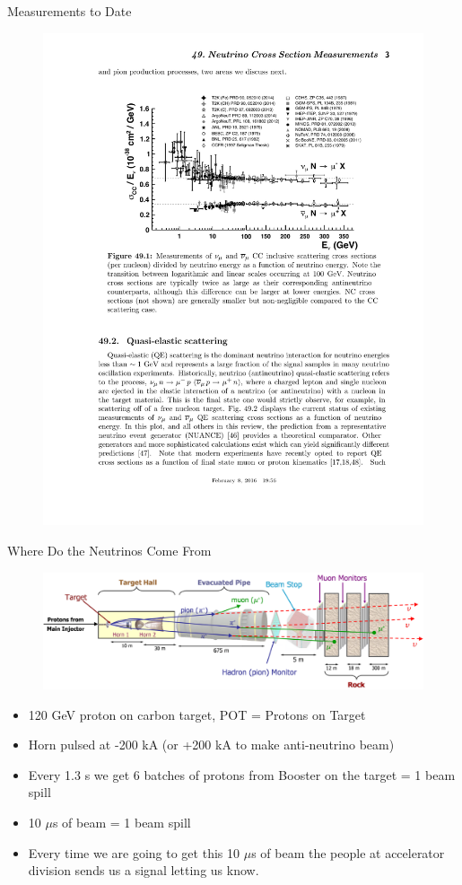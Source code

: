 \documentclass{beamer}
\begin{document}
\begin{frame}{Measurements to Date}
\begin{figure}
  \centering
  \includegraphics[width=\textwidth]{figures/xsec.pdf}
\end{figure}
\end{frame}

\begin{frame}{Where Do the Neutrinos Come From}
\begin{figure}
\centering
\includegraphics[width=\textwidth]{figures/beam.png}
\end{figure}
\begin{itemize}
  \item 120 GeV proton on carbon target, POT = Protons on Target
  \item Horn pulsed at -200 kA (or +200 kA to make anti-neutrino beam)
  \item Every 1.3 s we get 6 batches of protons from Booster on the target = 1 beam spill
  \item 10 $\mu$s of beam = 1 beam spill
  \item Every time we are going to get this 10 $\mu$s of beam the people at accelerator division sends us a signal letting us know.
\end{itemize}
\end{frame}
\end{document}
